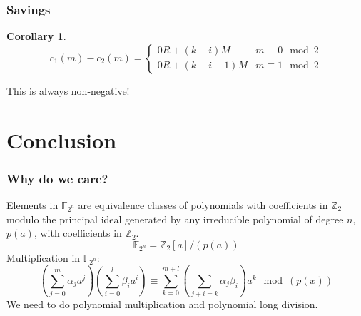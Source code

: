 \documentclass[xcolor=pdftex,dvipsnames,table]{beamer}
\theoremstyle{plain}
\newtheorem{cor}[thm]{Corollary}
\theoremstyle{definition}
\def\ZZ{\mathbb{Z}}
\def\FF{\mathbb{F}}
\newcommand{\paren}[1]{\left( #1 \right)}
\begin{document}
\begin{frame}
	\frametitle{Savings}
	
	\begin{cor} \label{savings}
		\begin{equation}
		c_1(m)-c_2(m)=\begin{cases}
		0R + (k-i)M & m\equiv 0\mod{2}\\
		0R + (k-i+1)M & m\equiv 1\mod{2}
		\end{cases}
		\end{equation}
	\end{cor}
	
	\begin{Large}
		\begin{center}
			This is always non-negative!
		\end{center}
	\end{Large}
\end{frame}

\section[Conclusion]{Conclusion}

\begin{frame}
	\frametitle{Why do we care?}
	
	Elements in $\FF_{2^n}$ are equivalence classes of polynomials with coefficients in $\ZZ_2$ modulo the principal ideal generated by any irreducible polynomial of degree $n$, $p(a)$, with coefficients in $\ZZ_2$.
	\[
	\FF_{2^n}=\ZZ_2[a]/(p(a))
	\]
	Multiplication in $\FF_{2^n}$:
	\[
	\paren{\sum_{j=0}^m \alpha_j a^j}\paren{\sum_{i=0}^l \beta_i a^i}\equiv \sum_{k=0}^{m+l} \paren{\sum_{j+i=k} \alpha_j\beta_i}a^k \mod{(p(x))}
	\]
	We need to do polynomial multiplication and polynomial long division.
\end{frame}
\end{document}
